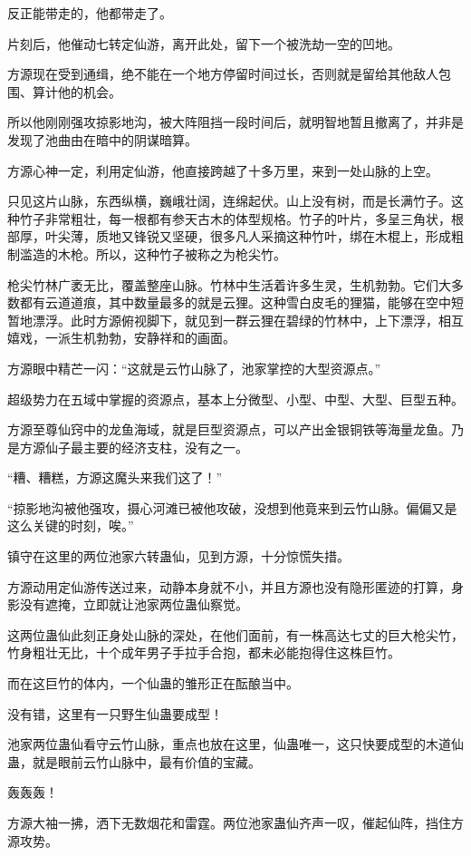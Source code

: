 \begin{this_body}
反正能带走的，他都带走了。

片刻后，他催动七转定仙游，离开此处，留下一个被洗劫一空的凹地。

方源现在受到通缉，绝不能在一个地方停留时间过长，否则就是留给其他敌人包围、算计他的机会。

所以他刚刚强攻掠影地沟，被大阵阻挡一段时间后，就明智地暂且撤离了，并非是发现了池曲由在暗中的阴谋暗算。

方源心神一定，利用定仙游，他直接跨越了十多万里，来到一处山脉的上空。

只见这片山脉，东西纵横，巍峨壮阔，连绵起伏。山上没有树，而是长满竹子。这种竹子非常粗壮，每一根都有参天古木的体型规格。竹子的叶片，多呈三角状，根部厚，叶尖薄，质地又锋锐又坚硬，很多凡人采摘这种竹叶，绑在木棍上，形成粗制滥造的木枪。所以，这种竹子被称之为枪尖竹。

枪尖竹林广袤无比，覆盖整座山脉。竹林中生活着许多生灵，生机勃勃。它们大多数都有云道道痕，其中数量最多的就是云狸。这种雪白皮毛的狸猫，能够在空中短暂地漂浮。此时方源俯视脚下，就见到一群云狸在碧绿的竹林中，上下漂浮，相互嬉戏，一派生机勃勃，安静祥和的画面。

方源眼中精芒一闪：“这就是云竹山脉了，池家掌控的大型资源点。”

超级势力在五域中掌握的资源点，基本上分微型、小型、中型、大型、巨型五种。

方源至尊仙窍中的龙鱼海域，就是巨型资源点，可以产出金银铜铁等海量龙鱼。乃是方源仙子最主要的经济支柱，没有之一。

“糟、糟糕，方源这魔头来我们这了！”

“掠影地沟被他强攻，摄心河滩已被他攻破，没想到他竟来到云竹山脉。偏偏又是这么关键的时刻，唉。”

镇守在这里的两位池家六转蛊仙，见到方源，十分惊慌失措。

方源动用定仙游传送过来，动静本身就不小，并且方源也没有隐形匿迹的打算，身影没有遮掩，立即就让池家两位蛊仙察觉。

这两位蛊仙此刻正身处山脉的深处，在他们面前，有一株高达七丈的巨大枪尖竹，竹身粗壮无比，十个成年男子手拉手合抱，都未必能抱得住这株巨竹。

而在这巨竹的体内，一个仙蛊的雏形正在酝酿当中。

没有错，这里有一只野生仙蛊要成型！

池家两位蛊仙看守云竹山脉，重点也放在这里，仙蛊唯一，这只快要成型的木道仙蛊，就是眼前云竹山脉中，最有价值的宝藏。

轰轰轰！

方源大袖一拂，洒下无数烟花和雷霆。两位池家蛊仙齐声一叹，催起仙阵，挡住方源攻势。


\end{this_body}
